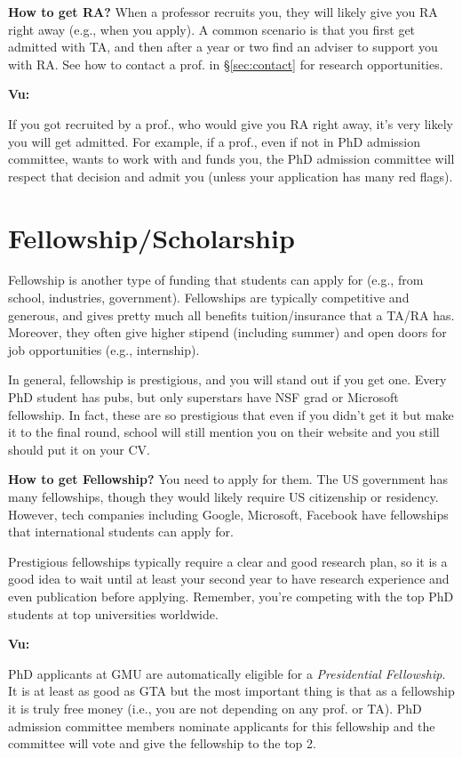 \documentclass[oneside,11pt]{memoir}
\newenvironment{commentbox}[1][]{
\small
    \begin{mybox}
    {\small \textbf{#1}}
 }{
   \end{mybox}
}
\begin{document}
\textbf{How to get RA?} When a professor recruits you, they will likely give you RA right away (e.g., when you apply).  A common scenario is that you first get admitted with TA, and then after a year or two find an adviser to support you with RA. See how to contact a prof. in \S\ref{sec:contact} for research opportunities.


\begin{commentbox}[Vu:]
If you got recruited by a prof., who would give you RA right away, it's very likely you will get admitted.  For example, if a prof., even if not in PhD admission committee, wants to work with and funds you, the PhD admission committee will respect that decision and admit you (unless your application has many red flags).
\end{commentbox}

\section{Fellowship/Scholarship}

Fellowship is another type of funding that students can apply for (e.g., from school, industries, government). Fellowships are typically competitive and generous, and gives pretty much all benefits tuition/insurance that a TA/RA has.  Moreover, they often give higher stipend (including summer) and open doors for job opportunities (e.g., internship).

In general, fellowship is prestigious, and you will stand out if you get one.  Every PhD student has pubs, but only superstars have NSF grad or Microsoft fellowship. In fact, these are so prestigious that even if you didn't get it but make it to the final round, school will still mention you on their website and you still should put it on your CV.


\textbf{How to get Fellowship?} You need to apply for them.  The US government has many fellowships, though they would likely require US citizenship or residency.  However, tech companies including Google, Microsoft, Facebook have fellowships that international students can apply for. 

Prestigious fellowships typically require a clear and good research plan, so it is a good idea to wait until at least your second year to have research experience and even publication before applying. Remember, you're competing with the top PhD students at top universities worldwide. 


\begin{commentbox}[Vu:]
PhD applicants at GMU are automatically eligible for a \emph{Presidential Fellowship}.  It is at least as good as GTA but the most important thing is that as a fellowship it is truly free money (i.e., you are not depending on any prof. or TA).  PhD admission committee members nominate applicants for this fellowship and the committee will vote and give the fellowship to the top 2.
\end{commentbox}
\end{document}
